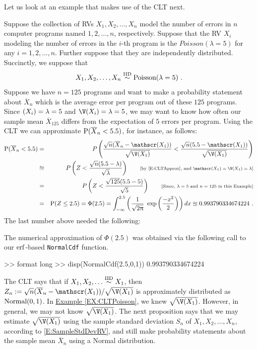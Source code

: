 {Let us look at an example that makes use of the CLT next.
\begin{example}\label{EX:CLTPoisson}
Suppose the collection of RVs $X_1,X_2, \ldots, X_n$ model the number of errors in $n$ computer programs named $1,2,\ldots,n$, respectively.  Suppose that the RV $X_i$ modeling the number of errors in the $i$-th program is the $Poisson(\lambda=5)$ for any $i=1,2,\ldots,n$.  Further suppose that they are independently distributed.  Succinctly, we suppose that 
\[
X_1,X_2,\ldots,X_n \overset{\IID}{\sim} \poisson(\lambda=5) \ . 
\]
Suppose we have $n=125$ programs and want to make a probability statement about $\overline{X}_n$ which is the average error per program out of these $125$ programs.  Since $\E(X_i) = \lambda=5$ and $\V(X_i)=\lambda=5$, we may want to know how often our sample mean $\overline{X}_{125}$ differs from the expectation of $5$ errors per program.  Using the CLT we can approximate $\P(\overline{X}_n < 5.5)$, for instance, as follows:
\begin{eqnarray}
\P(\overline{X}_n < 5.5) 
&=& P \left( \frac{\sqrt{n}(\overline{X}_n - \E(X_1))}{\sqrt{\V(X_1)}} < \frac{\sqrt{n}(5.5-\E(X_1))}{\sqrt{\V(X_1)}} \right) \notag \\
&\approxeq& P \left( Z < \frac{\sqrt{n}(5.5-\lambda)}{\sqrt{\lambda}} \right) \qquad \text{{\scriptsize [by \eqref{E:CLTApprox}, and $\E(X_1)=\V(X_1)=\lambda$]}} \notag \\
&=& P \left( Z < \frac{\sqrt{125}(5.5-5)}{\sqrt{5}} \right) \qquad \text{{\scriptsize [Since, $\lambda=5$ and $n=125$ in this Example]}} \notag \\
&=& \P(Z \leq 2.5) = \Phi(2.5) =  \int_{- \infty}^{2.5} \left( \frac{1}{\sqrt{2 \pi}} \ \exp \left( \frac{-x^2}{2} \right) \right) dx \approxeq 0.993790334674224 \ . \notag
\end{eqnarray}
The last number above needed the following:
\begin{labwork}
The numerical approximation of $\Phi(2.5)$ was obtained via the following call to our $\erf$-based {\tt NormalCdf} function. %
\begin{VrbM}
>> format long
>> disp(NormalCdf(2.5,0,1))
   0.993790334674224
\end{VrbM}
\end{labwork}
\end{example}
The CLT says that if $X_1,X_2,\ldots \overset{\IID}{\sim} X_1$, then $Z_n := \sqrt{n}(\overline{X}_n-\E(X_1))/\sqrt{\V(X_1)}$ is approximately distributed as $\normal(0,1)$.  In \hyperref[EX:CLTPoisson]{Example \ref*{EX:CLTPoisson}}, we knew $\sqrt{\V(X_1)}$.   However, in general, we may not know $\sqrt{\V(X_1)}$.  The next proposition says that we may estimate $\sqrt{\V(X_1)}$ using the sample standard deviation $S_n$ of $X_1,X_2,\ldots,X_n$, according to \eqref{E:SampleStdDevRV}, and still make probability statements about the sample mean $\overline{X}_n$ using a Normal distribution.
}
